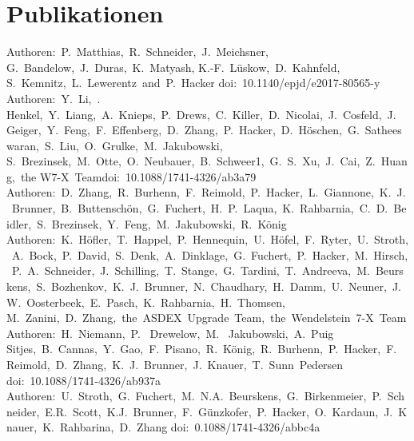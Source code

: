 \documentclass[11pt,a4paper]{moderncv}
\begin{document}
    \section{Publikationen}
        {Authoren:~P.~Matthias,~R.~Schneider,~J.~Meichsner,~%
         G.~Bandelow,~J.~Duras,~K.~Matyash, K.-F.~Lüskow,~D.~Kahnfeld,~%
         S.~Kemnitz,~L.~Lewerentz~and~P.~Hacker}{%
            doi:~10.1140/epjd/e2017-80565-y}{}{}
        {Authoren:~Y.~Li,~.~ Henkel,~Y.~Liang,~A.~Knieps,~P.~Drews,~C.~Killer,~D.~Nicolai,~J.~Cosfeld,~J.~Geiger,~Y.~Feng,~F.~Effenberg,~D.~Zhang,~P.~Hacker,~D.~Höschen,~G.~Satheeswaran,~S.~Liu,~O.~Grulke,~M.~Jakubowski, S.~Brezinsek,~M.~Otte,~O.~Neubauer,~B.~Schweer1,~G.~S.~Xu,~J.~Cai,~Z.~Huang,~the W7-X~Team}{doi:~10.1088/1741-4326/ab3a79}{}{}
        {Authoren:~D.~Zhang,~R.~Burhenn,~F.~Reimold,~P.~Hacker,~L.~Giannone,~K.~J.~Brunner,~B.~Buttenschön,~G.~Fuchert,~H.~P.~Laqua,~K.~Rahbarnia,~C.~D.~Beidler,~S.~Brezinsek,~Y.~Feng,~M.~Jakubowski,~R.~König}{}{}{}
        {Authoren:~K.~Höfler,~T.~Happel,~P.~Hennequin,~U.~Höfel,~F.~Ryter,~U.~Stroth,~A.~Bock,~P.~David,~S.~Denk,~A.~Dinklage,~G.~Fuchert,~P.~Hacker,~M.~Hirsch,~P.~A.~Schneider,~J.~Schilling,~T.~Stange,~G.~Tardini,~T.~Andreeva,~M.~Beurskens,~S.~Bozhenkov,~K.~J.~Brunner,~N.~Chaudhary,~H.~Damm,~U.~Neuner,~J.~W.~Oosterbeek,~E.~Pasch,~K.~Rahbarnia,~H.~Thomsen, M.~Zanini,~D.~Zhang,~the~ASDEX~Upgrade~Team,~the~Wendelstein~7-X~Team}{}{}{}
        {Authoren:~H.~Niemann,~P.~ Drewelow,~M.~ Jakubowski,~A.~Puig Sitjes,~B.~Cannas,~Y.~Gao,~F.~Pisano,~R.~König,~R.~Burhenn,~P.~Hacker,~F.~Reimold,~D.~Zhang,~K.~J.~Brunner,~J.~Knauer,~T.~Sunn~Pedersen}{%
        doi:~10.1088/1741-4326/ab937a}{}{}
        {Authoren:~U.~Stroth,~G.~Fuchert,~M.~N.A.~Beurskens,~G.~Birkenmeier,~P.~Schneider,~E.R.~Scott,~K.J.~Brunner,~F.~Günzkofer,~P.~Hacker,~O.~Kardaun,~J.~Knauer,~K.~Rahbarina,~D.~Zhang}{%
        doi:~0.1088/1741-4326/abbc4a}{}{}
    \newpage
\end{document}
